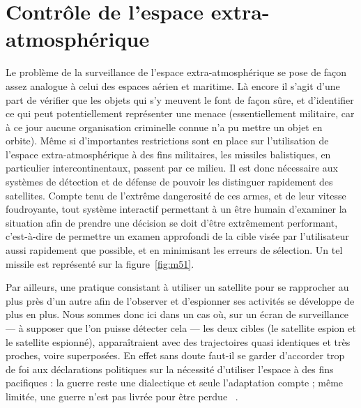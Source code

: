 	\section{Contrôle de l'espace extra-atmosphérique}
	Le problème de la surveillance de l'espace extra-atmosphérique se pose de façon assez analogue à celui des espaces aérien et maritime. Là encore il s'agit d'une part de vérifier que les objets qui s'y meuvent le font de façon sûre, et d'identifier ce qui peut potentiellement représenter une menace (essentiellement militaire, car à ce jour aucune organisation criminelle connue n'a pu mettre un objet en orbite). Même si d'importantes restrictions sont en place sur l'utilisation de l'espace extra-atmosphérique à des fins militaires,\footnotemark{} les missiles balistiques, en particulier intercontinentaux, passent par ce milieu. Il est donc nécessaire aux systèmes de détection et de défense de pouvoir les distinguer rapidement des satellites. Compte tenu de l'extrême dangerosité de ces armes, et de leur vitesse foudroyante, tout système interactif permettant à un être humain d'examiner la situation afin de prendre une décision se doit d'être extrêmement performant, c'est-à-dire de permettre un examen approfondi de la cible visée par l'utilisateur aussi rapidement que possible, et en minimisant les erreurs de sélection. Un tel missile est représenté sur la figure~\ref{fig:m51}.
	
	Par ailleurs, une pratique consistant à utiliser un satellite pour se rapprocher au plus près d'un autre afin de l'observer et d'espionner ses activités se développe de plus en plus. Nous sommes donc ici dans un cas où, sur un écran de surveillance --- à supposer que l'on puisse détecter cela --- les deux cibles (le satellite espion et le satellite espionné), apparaîtraient avec des trajectoires quasi identiques et très proches, voire superposées. En effet \og sans doute faut-il se garder d’accorder trop de foi aux déclarations politiques sur la nécessité d’utiliser l’espace à des fins pacifiques : la guerre reste une dialectique et seule l’adaptation compte ; même limitée, une guerre n’est pas livrée pour être perdue \fg{}~\cite{henrotin2013asat}.
	
	
